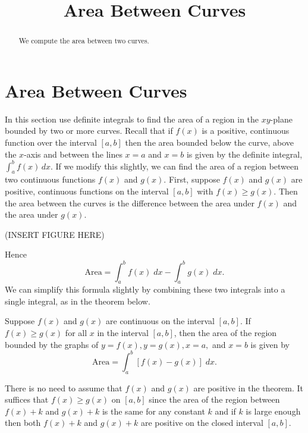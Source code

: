 \documentclass{ximera}
\title{Area Between Curves}
\begin{document}
\begin{abstract}
We compute the area between two curves.
\end{abstract}

\maketitle

\section{Area Between Curves}

In this section use definite integrals to find the area of a region 
in the $xy$-plane bounded by two or more curves. Recall that if $f(x)$ is a positive, continuous function 
over the interval $[a, b]$ then the area bounded below the curve, above the $x$-axis and between the lines $x = a$
and $x = b$ is given by the definite integral, $\int_a^b f(x) \, dx$. If we modify this slightly, 
we can find the area of a region between two continuous functions $f(x)$ and $g(x)$. First, suppose $f(x)$ and $g(x)$
are positive, continuous functions on the interval $[a,b]$ with $f(x) \geq g(x)$.
Then the area between the curves is the difference between the area under $f(x)$ and the area under $g(x)$.

(INSERT FIGURE HERE)

Hence
\[
\text{Area} = \int_a^b f(x) \; dx - \int_a^b g(x) \; dx.
\]
We can simplify this formula slightly by combining these two integrals into a single integral, as in the theorem below. 


\begin{theorem}
Suppose $f(x)$ and $g(x)$ are continuous on the interval $[a,b]$. If $f(x) \geq g(x)$ for all $x$ in the interval $[a,b]$, 
then the area of the region bounded by the graphs of $y = f(x), y=g(x), x=a,$ and $x=b$ is given by  
\[
\text{Area} = \int_a^b \left[f(x) -g(x)\right] \; dx.
\]
\end{theorem}


\begin{remark}
There is no need to assume that $f(x)$ and $g(x)$ are positive in the theorem.  It suffices that $f(x) \geq g(x)$ on $[a,b]$ since the area of the region between 
$f(x) + k$ and $g(x) + k$ is the same for any constant $k$ and if $k$ is large enough then both $f(x) + k$ and $g(x) + k$ are positive
on the closed interval $[a,b]$.
\end{remark}
\end{document}
